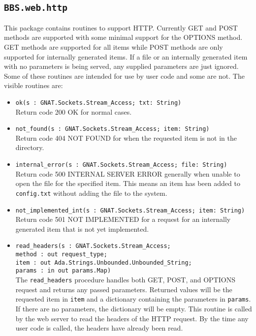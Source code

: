 \documentclass[10pt, openany]{book}
\newcommand{\package}[1]{\texttt{#1}}
\newcommand{\function}[1]{\texttt{#1}}
\newcommand{\keyword}[1]{\texttt{#1}}
\begin{document}
\subsection{\package{BBS.web.http}}
This package contains routines to support HTTP.  Currently GET and POST methods are supported with some minimal support for the OPTIONS method.  GET methods are supported for all items while POST methods are only supported for internally generated items.  If a file or an internally generated item with no parameters is being served, any supplied parameters are just ignored. Some of these routines are intended for use by user code and some are not.  The visible routines are:
\begin{itemize}
  \item \verb|ok(s : GNAT.Sockets.Stream_Access; txt: String)|\\
  Return code 200 OK for normal cases.
  \item \verb|not_found(s : GNAT.Sockets.Stream_Access; item: String)|\\
  Return code 404 NOT FOUND for when the requested item is not in the directory.
  \item \verb|internal_error(s : GNAT.Sockets.Stream_Access; file: String)|\\
  Return code 500 INTERNAL SERVER ERROR generally when unable to open the file for the specified item.  This means an item has been added to \texttt{config.txt} without adding the file to the system.
  \item \verb|not_implemented_int(s : GNAT.Sockets.Stream_Access; item: String)|\\
  Return code 501 NOT IMPLEMENTED for a request for an internally generated item that is not yet implemented.
  \item \function{read\_headers(s : GNAT.Sockets.Stream\_Access;\\
             method : out request\_type;\\
             item : out Ada.Strings.Unbounded.Unbounded\_String;\\
             params : in out params.Map)}\\
   The \function{read\_headers} procedure handles both GET, POST, and OPTIONS request and returns any passed parameters.  Returned values will be the requested item in \keyword{item} and a dictionary containing the parameters in \keyword{params}.  If there are no parameters, the dictionary will be empty.  This routine is called by the web server to read the headers of the HTTP request.  By the time any user code is called, the headers have already been read.
\end{itemize}
\end{document}
